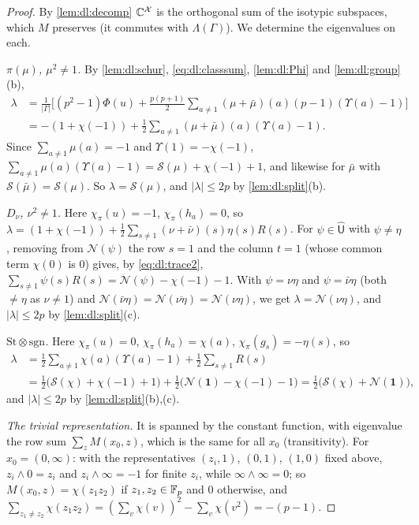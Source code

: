\begin{proof}
By \cref{lem:dl:decomp} $\mathbb C^{\mathcal X}$ is the orthogonal sum of the isotypic
subspaces, which $M$ preserves (it commutes with $\Lambda(\Gamma)$). We
determine the eigenvalues on each.

\emph{$\pi(\mu)$, $\mu^2\ne1$.} By \cref{lem:dl:schur}, \eqref{eq:dl:classsum},
\cref{lem:dl:Phi} and \cref{lem:dl:group}(b),
\begin{align*}
  \lambda&=\frac1{|\Gamma|}\Big[(p^2-1)\Phi(u)
    +\frac{p(p+1)}2\sum_{a\ne1}(\mu+\bar\mu)(a)(p-1)(\Upsilon(a)-1)\Big]\\
  &=-(1+\chi(-1))+\frac12\sum_{a\ne1}(\mu+\bar\mu)(a)(\Upsilon(a)-1).
\end{align*}
Since $\sum_{a\ne1}\mu(a)=-1$ and $\Upsilon(1)=-\chi(-1)$,
$\sum_{a\ne1}\mu(a)(\Upsilon(a)-1)=\mathcal S(\mu)+\chi(-1)+1$, and likewise for
$\bar\mu$ with $\mathcal S(\bar\mu)=\mathcal S(\mu)$. So
$\lambda=\mathcal S(\mu)$, and $|\lambda|\le2p$ by \cref{lem:dl:split}(b).

\emph{$D_\nu$, $\nu^2\ne1$.} Here $\chi_\pi(u)=-1$, $\chi_\pi(h_a)=0$, so
$\lambda=(1+\chi(-1))+\frac12\sum_{s\ne1}(\nu+\bar\nu)(s)\eta(s)R(s)$. For
$\psi\in\widehat{\mathsf U}$ with $\psi\ne\eta$, removing from $\mathcal N(\psi)$
the row $s=1$ and the column $t=1$ (whose common term $\chi(0)$ is $0$) gives,
by \eqref{eq:dl:trace2}, $\sum_{s\ne1}\psi(s)R(s)=\mathcal N(\psi)-\chi(-1)-1$.
With $\psi=\nu\eta$ and $\psi=\bar\nu\eta$ (both $\ne\eta$ as $\nu\ne1$) and
$\mathcal N(\bar\nu\eta)=\mathcal N(\overline{\nu\eta})=\mathcal N(\nu\eta)$, we
get $\lambda=\mathcal N(\nu\eta)$, and $|\lambda|\le2p$ by
\cref{lem:dl:split}(c).

\emph{$\mathrm{St}\otimes\mathrm{sgn}$.} Here $\chi_\pi(u)=0$,
$\chi_\pi(h_a)=\chi(a)$, $\chi_\pi(g_s)=-\eta(s)$, so
\begin{align*}
  \lambda&=\frac12\sum_{a\ne1}\chi(a)(\Upsilon(a)-1)+\frac12\sum_{s\ne1}R(s)\\
  &=\frac12\big(\mathcal S(\chi)+\chi(-1)+1\big)
  +\frac12\big(\mathcal N(\mathbf 1)-\chi(-1)-1\big)
  =\frac12\big(\mathcal S(\chi)+\mathcal N(\mathbf 1)\big),
\end{align*}
and $|\lambda|\le2p$ by \cref{lem:dl:split}(b),(c).

\emph{The trivial representation.} It is spanned by the constant function, with
eigenvalue the row sum $\sum_zM(x_0,z)$, which is the same for all $x_0$
(transitivity). For $x_0=(0,\infty)$: with the representatives $(z_i,1)$, $(0,1)$, $(1,0)$ fixed above, $z_i\wedge0=z_i$ and $z_i\wedge\infty=-1$
for finite $z_i$, while $\infty\wedge\infty=0$; so $M(x_0,z)=\chi(z_1z_2)$ if
$z_1,z_2\in\mathbb F_p$ and $0$ otherwise, and
$\sum_{z_1\ne z_2}\chi(z_1z_2)=(\sum_{v}\chi(v))^2-\sum_v\chi(v^2)=-(p-1)$.


\end{proof}
